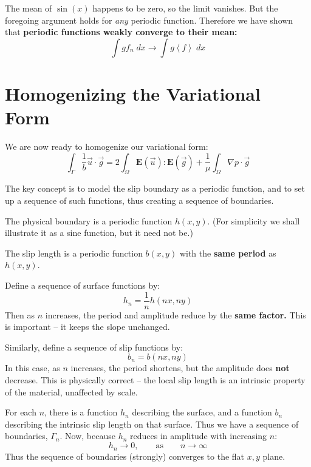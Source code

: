 \documentclass[a4paper]{report}
\begin{document}
The mean of $\sin(x)$ happens to be zero, so the limit vanishes.  But the foregoing argument holds for \emph{any} periodic function.  Therefore we have shown that \textbf{periodic functions weakly converge to their mean:}
\begin{equation}
\int g f_n \;dx \to \int g \left< f \right> \;dx
\end{equation}


\section*{Homogenizing the Variational Form}

We are now ready to homogenize our variational form:
\begin{equation}
\int_{\Gamma} \frac{1}{b} \vec{u} \cdot \vec{g} = 
2 \int_{\Omega} \mathbf{E}(\vec{u}) : \mathbf{E}(\vec{g}) +
\frac{1}{\mu} \int_{\Omega}  \nabla p \cdot \vec{g}
\end{equation}

The key concept is to model the slip boundary as a periodic function, and to set up a sequence of such functions, thus creating a sequence of boundaries.
\vspace{1em}

The physical boundary is a periodic function $h(x,y)$.  (For simplicity we shall illustrate it as a sine function, but it need not be.)  

The slip length is a periodic function $b(x,y)$ with the \textbf{same period} as $h(x,y)$.

\vspace{1em}
Define a sequence of surface functions by:
\begin{equation}
h_n = \frac{1}{n} h(nx, ny)
\end{equation}
Then as $n$ increases, the period and amplitude reduce by the \textbf{same factor.}  This is important -- it keeps the slope unchanged.

Similarly, define a sequence of slip functions by:
\begin{equation}
b_n = b(nx,ny)
\end{equation}
In this case, as $n$ increases, the period shortens, but the amplitude does \textbf{not} decrease.  This is physically correct -- the local slip length is an intrinsic property of the material, unaffected by scale.

For each $n$, there is a function $h_n$ describing the surface, and a function $b_n$ describing the intrinsic slip length on that surface.  Thus we have a sequence of boundaries, $\Gamma_n$.
Now, because $h_n$ reduces in amplitude with increasing $n$:
\begin{equation}
h_n \to 0, \qquad \text{as} \qquad n \to \infty
\end{equation}
Thus the sequence of boundaries (strongly) converges to the flat $x,y$ plane.
\end{document}
